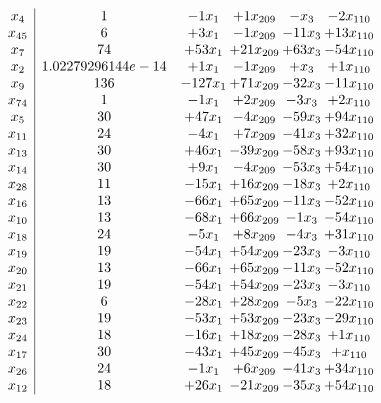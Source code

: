 \documentclass[11pt]{article}
\begin{document}
\[\begin{array}{c| c c@{\hskip 2pt} c@{\hskip 2pt} c@{\hskip 2pt} c@{\hskip 2pt} }
 x_{4}   &  1 & -1 x_{1} & + 1 x_{209} & - x_{3} & -2 x_{110}\\
 x_{45}   &  6 & + 3 x_{1} & -1 x_{209} & -11 x_{3} & + 13 x_{110}\\
 x_{7}   &  74 & + 53 x_{1} & + 21 x_{209} & + 63 x_{3} & -54 x_{110}\\
 x_{2}   &  1.02279296144e-14 & + 1 x_{1} & -1 x_{209} & +  x_{3} & + 1 x_{110}\\
 x_{9}   &  136 & -127 x_{1} & + 71 x_{209} & -32 x_{3} & -11 x_{110}\\
 x_{74}   &  1 & -1 x_{1} & + 2 x_{209} & -3 x_{3} & + 2 x_{110}\\
 x_{5}   &  30 & + 47 x_{1} & -4 x_{209} & -59 x_{3} & + 94 x_{110}\\
 x_{11}   &  24 & -4 x_{1} & + 7 x_{209} & -41 x_{3} & + 32 x_{110}\\
 x_{13}   &  30 & + 46 x_{1} & -39 x_{209} & -58 x_{3} & + 93 x_{110}\\
 x_{14}   &  30 & + 9 x_{1} & -4 x_{209} & -53 x_{3} & + 54 x_{110}\\
 x_{28}   &  11 & -15 x_{1} & + 16 x_{209} & -18 x_{3} & + 2 x_{110}\\
 x_{16}   &  13 & -66 x_{1} & + 65 x_{209} & -11 x_{3} & -52 x_{110}\\
 x_{10}   &  13 & -68 x_{1} & + 66 x_{209} & -1 x_{3} & -54 x_{110}\\
 x_{18}   &  24 & -5 x_{1} & + 8 x_{209} & -4 x_{3} & + 31 x_{110}\\
 x_{19}   &  19 & -54 x_{1} & + 54 x_{209} & -23 x_{3} & -3 x_{110}\\
 x_{20}   &  13 & -66 x_{1} & + 65 x_{209} & -11 x_{3} & -52 x_{110}\\
 x_{21}   &  19 & -54 x_{1} & + 54 x_{209} & -23 x_{3} & -3 x_{110}\\
 x_{22}   &  6 & -28 x_{1} & + 28 x_{209} & -5 x_{3} & -22 x_{110}\\
 x_{23}   &  19 & -53 x_{1} & + 53 x_{209} & -23 x_{3} & -29 x_{110}\\
 x_{24}   &  18 & -16 x_{1} & + 18 x_{209} & -28 x_{3} & + 1 x_{110}\\
 x_{17}   &  30 & -43 x_{1} & + 45 x_{209} & -45 x_{3} & +  x_{110}\\
 x_{26}   &  24 & -1 x_{1} & + 6 x_{209} & -41 x_{3} & + 34 x_{110}\\
 x_{12}   &  18 & + 26 x_{1} & -21 x_{209} & -35 x_{3} & + 54 x_{110}\\

\end{array}\]
\end{document}
